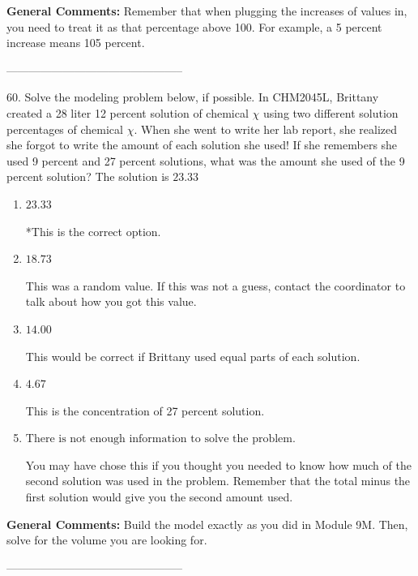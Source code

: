 \documentclass{extbook}[14pt]
\begin{document}
\textbf{General Comments:} Remember that when plugging the increases of values in, you need to treat it as that percentage above 100. For example, a 5 percent increase means 105 percent.

-----------------------------------------------

60. Solve the modeling problem below, if possible.
In CHM2045L, Brittany created a 28 liter 12 percent solution of chemical $\chi$ using two different solution percentages of chemical $\chi$. When she went to write her lab report, she realized she forgot to write the amount of each solution she used! If she remembers she used 9 percent and 27 percent solutions, what was the amount she used of the 9 percent solution? 
The solution is $ 23.33 $ 

\begin{enumerate}[label=\Alph*.] 
\item $ 23.33 $ 

 *This is the correct option. 
\item $ 18.73 $ 

 This was a random value. If this was not a guess, contact the coordinator to talk about how you got this value. 
\item $ 14.00 $ 

 This would be correct if Brittany used equal parts of each solution. 
\item $ 4.67 $ 

 This is the concentration of 27 percent solution. 
\item $ \text{There is not enough information to solve the problem.} $ 

 You may have chose this if you thought you needed to know how much of the second solution was used in the problem. Remember that the total minus the first solution would give you the second amount used. 
\end{enumerate} 
 
\textbf{General Comments:} Build the model exactly as you did in Module 9M. Then, solve for the volume you are looking for.

-----------------------------------------------
\end{document}
